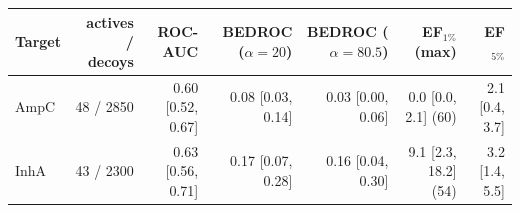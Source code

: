 \begin{tabular}{lrrrrrr}
\toprule
Target & actives / decoys & ROC-AUC & BEDROC ($\alpha=20$) & BEDROC ($\alpha=80.5$) & EF$_{1\%}$ (max) & EF$_{5\%}$ \\
\midrule
AmpC & 48 / 2850 & 0.60 [0.52, 0.67] & 0.08 [0.03, 0.14] & 0.03 [0.00, 0.06] & 0.0 [0.0, 2.1] (60) & 2.1 [0.4, 3.7] \\
InhA & 43 / 2300 & 0.63 [0.56, 0.71] & 0.17 [0.07, 0.28] & 0.16 [0.04, 0.30] & 9.1 [2.3, 18.2] (54) & 3.2 [1.4, 5.5] \\
\bottomrule
\end{tabular}
